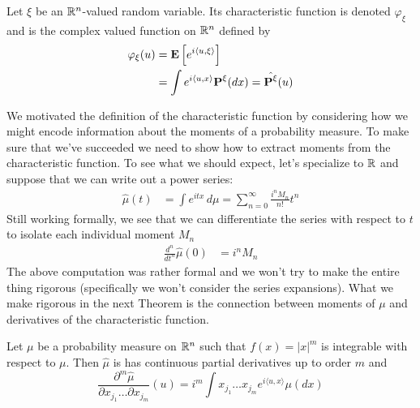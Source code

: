 \begin{defn}Let $\xi$ be an $\mathbb{R}^n$-valued random variable. Its
  characteristic function is denoted $\varphi_\xi$ and is the complex
  valued function on
  $\mathbb{R}^n$ defined by 
\begin{align*}
\varphi_\xi(u) &= \textbf{E}\left[e^{i\langle u,\xi \rangle}\right] \\
&= \int e^{i\langle u,x \rangle} \textbf{P}^{\xi}(dx) =
\hat{\textbf{P}^{\xi}}(u) 
\end{align*}
\end{defn}

We motivated the definition of the characteristic function by
considering how we might encode information about the moments of a
probability measure.  To make sure that we've succeeded we need to
show how to extract moments from the characteristic function.  To see
what we should expect, let's specialize to $\mathbb{R}$ and suppose that
we can write out a power series:
\begin{align*}
\hat{\mu}(t) &= \int e^{itx} \, d\mu = \sum_{n=0}^\infty \frac{i^n
  M_n}{n!} t^n
\end{align*}
Still working formally, we see that we can differentiate the series with respect
to $t$ to isolate each individual moment $M_n$
\begin{align*}
\frac{d^n}{dt^n} \hat{\mu}(0) &= i^n M_n
\end{align*}
The above computation was rather formal and we won't try to make the
entire thing rigorous (specifically we won't consider the series
expansions).  What we make rigorous in the next Theorem is the connection between
moments of $\mu$ and derivatives of the characteristic function.
\begin{thm}\label{MomentsAndDerivatives} Let $\mu$ be a probability measure on $\mathbb{R}^n$ such that
  $f(x) = \left| x \right| ^ m$ is integrable with respect to $\mu$.
  Then $\hat{\mu}$ is has continuous partial derivatives up to order
  $m$ and 
\begin{equation*}
 \frac{\partial^m \hat{\mu}} {\partial x_{j_1} \ldots \partial x_{j_m}}(u) =
 i^m \int x_{j_1} \ldots x_{j_m}e^{i\langle u,x \rangle} \mu(dx)
\end{equation*}
\end{thm}
